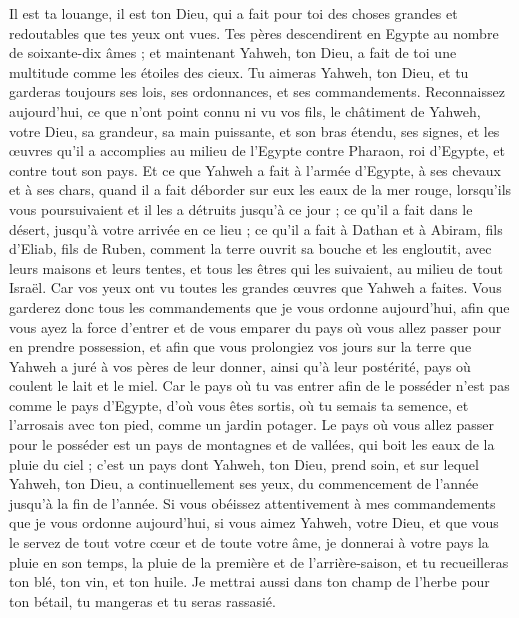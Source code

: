 \begin{multicols}{2}
Il est ta louange, il est ton Dieu, qui a fait pour toi des choses grandes et redoutables que tes yeux ont vues.
Tes pères descendirent en Egypte au nombre de soixante-dix âmes ; et maintenant Yahweh, ton Dieu, a fait de toi une multitude comme les étoiles des cieux.
\VerseOne{}Tu aimeras Yahweh, ton Dieu, et tu garderas toujours ses lois, ses ordonnances, et ses commandements.
Reconnaissez aujourd'hui, ce que n’ont point connu ni vu vos fils, le châtiment de Yahweh, votre Dieu, sa grandeur, sa main puissante, et son bras étendu,
ses signes, et les œuvres qu'il a accomplies au milieu de l'Egypte contre Pharaon, roi d'Egypte, et contre tout son pays.
Et ce que Yahweh a fait à l'armée d'Egypte, à ses chevaux et à ses chars, quand il a fait déborder sur eux les eaux de la mer rouge, lorsqu'ils vous poursuivaient et il les a détruits jusqu'à ce jour ;
ce qu'il a fait dans le désert, jusqu'à votre arrivée en ce lieu ;
ce qu'il a fait à Dathan et à Abiram, fils d'Eliab, fils de Ruben, comment la terre ouvrit sa bouche et les engloutit, avec leurs maisons et leurs tentes, et tous les êtres qui les suivaient, au milieu de tout Israël.
Car vos yeux ont vu toutes les grandes œuvres que Yahweh a faites.
Vous garderez donc tous les commandements que je vous ordonne aujourd'hui, afin que vous ayez la force d’entrer et de vous emparer du pays où vous allez passer pour en prendre possession,
et afin que vous prolongiez vos jours sur la terre que Yahweh a juré à vos pères de leur donner, ainsi qu’à leur postérité, pays où coulent le lait et le miel.
Car le pays où tu vas entrer afin de le posséder n'est pas comme le pays d'Egypte, d’où vous êtes sortis, où tu semais ta semence, et l'arrosais avec ton pied, comme un jardin potager.
Le pays où vous allez passer pour le posséder est un pays de montagnes et de vallées, qui boit les eaux de la pluie du ciel ;
c'est un pays dont Yahweh, ton Dieu, prend soin, et sur lequel Yahweh, ton Dieu, a continuellement ses yeux, du commencement de l'année jusqu'à la fin de l’année.
Si vous obéissez attentivement à mes commandements que je vous ordonne aujourd'hui, si vous aimez Yahweh, votre Dieu, et que vous le servez de tout votre cœur et de toute votre âme,
je donnerai à votre pays la pluie en son temps, la pluie de la première et de l’arrière-saison, et tu recueilleras ton blé, ton vin, et ton huile.
Je mettrai aussi dans ton champ de l'herbe pour ton bétail, tu mangeras et tu seras rassasié.

\end{multicols}
